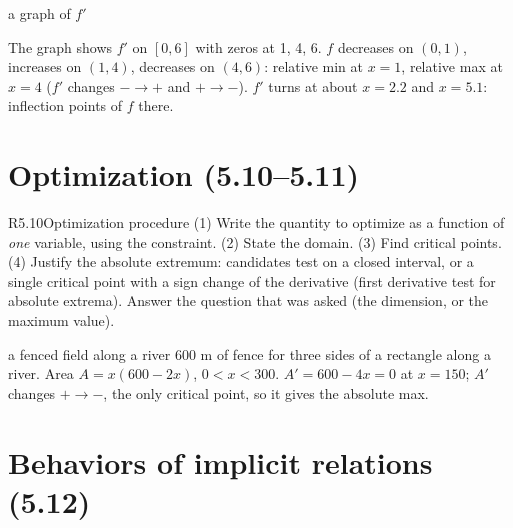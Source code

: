 \documentclass{apcalc}
\begin{document}
\begin{example}{a graph of $f'$}
\begin{center}
\end{center}
The graph shows $f'$ on $[0,6]$ with zeros at 1, 4, 6. $f$ decreases on $(0,1)$, increases on $(1,4)$, decreases on $(4,6)$: relative min at $x=1$, relative max at $x=4$ ($f'$ changes $-\to+$ and $+\to-$). $f'$ turns at about $x=2.2$ and $x=5.1$: inflection points of $f$ there.
\end{example}

\section{Optimization (5.10--5.11)}

\begin{rulebox}{R5.10}{Optimization procedure}
(1) Write the quantity to optimize as a function of \emph{one} variable, using the constraint. (2) State the domain. (3) Find critical points. (4) Justify the absolute extremum: candidates test on a closed interval, or a single critical point with a sign change of the derivative (first derivative test for absolute extrema). Answer the question that was asked (the dimension, or the maximum value).
\end{rulebox}

\begin{example}{a fenced field along a river}
600 m of fence for three sides of a rectangle along a river. Area $A=x(600-2x)$, $0<x<300$. $A'=600-4x=0$ at $x=150$; $A'$ changes $+\to-$, the only critical point, so it gives the absolute max. 
\end{example}

\section{Behaviors of implicit relations (5.12)}
\end{document}
